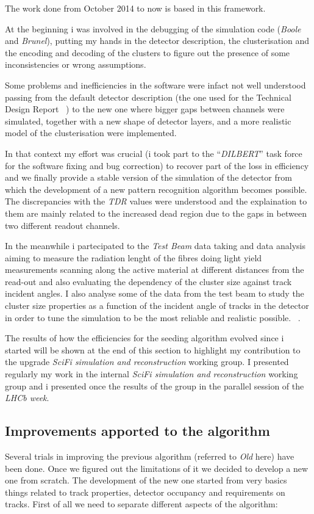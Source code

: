 \documentclass[paper=a4, fontsize=10pt]{scrartcl}
\numberwithin{equation}{section}		%
\numberwithin{figure}{section}			%
\numberwithin{table}{section}				%
\begin{document}
The work done from October 2014 to now is based in this framework. 

At the beginning i was involved in the debugging of the simulation code (\textit{Boole} and \textit{Brunel}), putting my hands in the detector description, the clusterisation and the encoding and decoding of the clusters to figure out the presence of some inconsistencies or wrong assumptions.

Some problems and inefficiencies in the software were infact not well understood passing from the default detector description (the one used for the Technical Design Report ~\cite{SciFiTDR}) to the new one where bigger gaps between channels were simulated, together with a new shape of detector layers, and a more realistic model of the clusterisation were implemented. 

In that context my effort was crucial (i took part to the ``\textit{DILBERT}'' task force for the software fixing and bug correction) to recover part of the loss in efficiency and we finally provide a stable version of the simulation of the detector from which the development of a new pattern recognition algorithm becomes possible. The discrepancies with the \textit{TDR} values were understood and the explaination to them are mainly related to the increased dead region due to the gaps in between two different readout channels.

In the meanwhile i partecipated to the \textit{Test Beam} data taking and data analysis aiming to measure the radiation lenght of the fibres doing light yield measurements scanning along the active material at different distances from the read-out and also evaluating the dependency of the cluster size against track incident angles. I also analyse some of the data from the test beam to study the cluster size properties as a function of the incident angle of tracks in the detector in order to tune the simulation to be the most reliable and realistic possible. ~\cite{AnalysisOrsay}.

The results of how the efficiencies for the seeding algorithm evolved since i started will be shown at the end of this section to highlight my contribution to the upgrade \textit{SciFi simulation and reconstruction} working group. I presented regularly my work in the internal \textit{SciFi simulation and reconstruction} working group and i presented once the results of the group in the parallel session of the \textit{LHCb week}. 

\subsection{Improvements apported to the algorithm}
Several trials in improving the previous algorithm (referred to \textit{Old} here) have been done. Once we figured out the limitations of it we decided to develop a new one from scratch. The development of the new one started from very basics things related to track properties, detector occupancy and requirements on tracks.
First of all we need to separate different aspects of the algorithm: 
\end{document}
